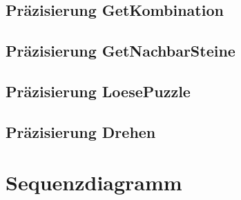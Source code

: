 \subsection{Präzisierung GetKombination}
\subsection{Präzisierung GetNachbarSteine}
\subsection{Präzisierung LoesePuzzle}
\subsection{Präzisierung Drehen}
\clearpage

\section{Sequenzdiagramm}
\cleardoublepage